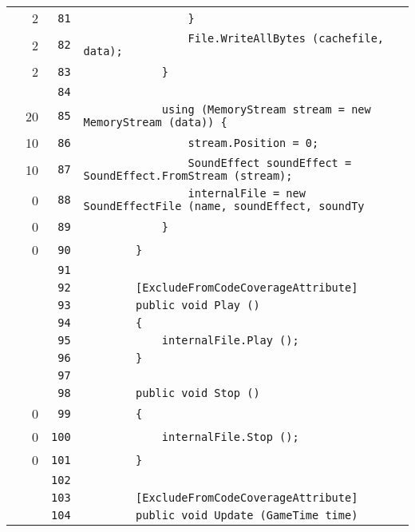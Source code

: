 \documentclass[a4paper,10pt]{article}
\begin{document}
\begin{longtable}[l]{lrrl}
\cellcolor{green} & 2 & \verb~81~ & \verb~                }~\\
\cellcolor{green} & 2 & \verb~82~ & \verb~                File.WriteAllBytes (cachefile, data);~\\
\cellcolor{green} & 2 & \verb~83~ & \verb~            }~\\
\cellcolor{gray} &  & \verb~84~ & \verb~~\\
\cellcolor{green} & 20 & \verb~85~ & \verb~            using (MemoryStream stream = new MemoryStream (data)) {~\\
\cellcolor{green} & 10 & \verb~86~ & \verb~                stream.Position = 0;~\\
\cellcolor{green} & 10 & \verb~87~ & \verb~                SoundEffect soundEffect = SoundEffect.FromStream (stream);~\\
\cellcolor{red} & 0 & \verb~88~ & \verb~                internalFile = new SoundEffectFile (name, soundEffect, soundTy~\\
\cellcolor{red} & 0 & \verb~89~ & \verb~            }~\\
\cellcolor{red} & 0 & \verb~90~ & \verb~        }~\\
\cellcolor{gray} &  & \verb~91~ & \verb~~\\
\cellcolor{gray} &  & \verb~92~ & \verb~        [ExcludeFromCodeCoverageAttribute]~\\
\cellcolor{gray} &  & \verb~93~ & \verb~        public void Play ()~\\
\cellcolor{gray} &  & \verb~94~ & \verb~        {~\\
\cellcolor{gray} &  & \verb~95~ & \verb~            internalFile.Play ();~\\
\cellcolor{gray} &  & \verb~96~ & \verb~        }~\\
\cellcolor{gray} &  & \verb~97~ & \verb~~\\
\cellcolor{gray} &  & \verb~98~ & \verb~        public void Stop ()~\\
\cellcolor{red} & 0 & \verb~99~ & \verb~        {~\\
\cellcolor{red} & 0 & \verb~100~ & \verb~            internalFile.Stop ();~\\
\cellcolor{red} & 0 & \verb~101~ & \verb~        }~\\
\cellcolor{gray} &  & \verb~102~ & \verb~~\\
\cellcolor{gray} &  & \verb~103~ & \verb~        [ExcludeFromCodeCoverageAttribute]~\\
\cellcolor{gray} &  & \verb~104~ & \verb~        public void Update (GameTime time)~\\

\end{longtable}
\end{document}
